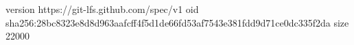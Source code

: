 version https://git-lfs.github.com/spec/v1
oid sha256:28bc8323e8d8d963aafcff4f5d1de66fd53af7543e381fdd9d71ce0dc335f2da
size 22000
